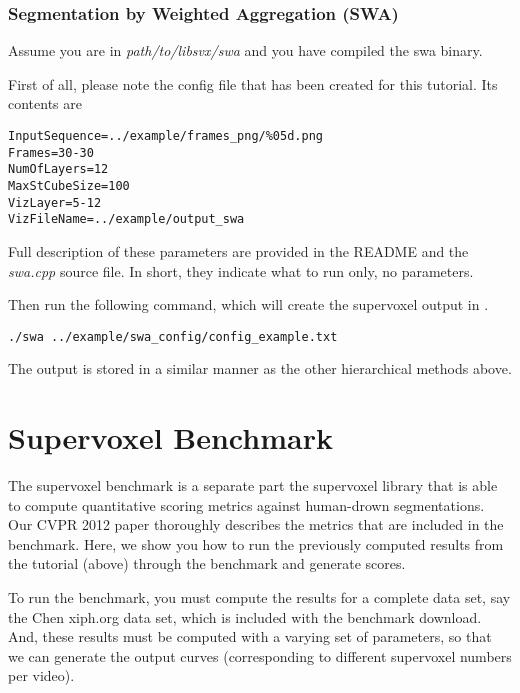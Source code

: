 \documentclass{article}
\begin{document}
\subsubsection{Segmentation by Weighted Aggregation (SWA)}
\label{sec:swa}
Assume you are in \textit{path\slash to\slash libsvx\slash swa} and you have compiled the swa binary. 

First of all, please note the config file  that has been created for this tutorial. Its contents are
\begin{verbatim}
InputSequence=../example/frames_png/%05d.png
Frames=30-30
NumOfLayers=12
MaxStCubeSize=100
VizLayer=5-12
VizFileName=../example/output_swa
\end{verbatim}

Full description of these parameters are provided in the README and the \textit{swa.cpp} source file.  In short, they indicate what to run only, no parameters.

Then run the following command, which will create the supervoxel output in .

\begin{verbatim}
./swa ../example/swa_config/config_example.txt
\end{verbatim}

The output is stored in a similar manner as the other hierarchical methods above.

\section{Supervoxel Benchmark}
\label{sec:benchmark}
The supervoxel benchmark is a separate part the supervoxel library that is able to compute quantitative scoring metrics against human-drown segmentations. Our CVPR 2012 paper thoroughly describes the metrics that are included in the benchmark. Here, we show you how to run the previously computed results from the tutorial (above) through the benchmark and generate scores.

To run the benchmark, you must compute the results for a complete data set, say the Chen xiph.org data set, which is included with the benchmark download. And, these results must be computed with a varying set of parameters, so that we can generate the output curves (corresponding to different supervoxel numbers per video).  
\end{document}

